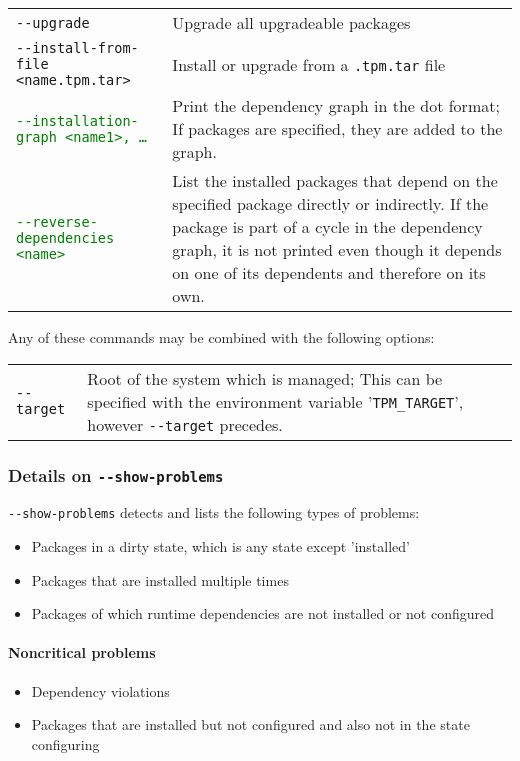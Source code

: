 \documentclass[a4paper]{article}
\newcommand{\variable}[1]{'\texttt{#1}'}
\newcommand{\green}[1]{\textcolor{green}{#1}}
\begin{document}
\begin{tabularx}{\textwidth}{lX}
		\texttt{-{}-upgrade} & Upgrade all upgradeable packages \\
		
		\texttt{-{}-install-from-file <name.tpm.tar>} & Install or upgrade from a \texttt{.tpm.tar} file \\
		
		\green{\texttt{-{}-installation-graph <name1>, \dots}} & Print the dependency graph in the dot format; If packages are specified, they are added to the graph. \\
		
		\green{\texttt{-{}-reverse-dependencies <name>}} & List the installed packages that depend on the specified package directly or indirectly. If the package is part of a cycle in the dependency graph, it is not printed even though it depends on one of its dependents and therefore on its own. \\
		
	\end{tabularx}
	\egroup

	\vspace{1em}
	Any of these commands may be combined with the following options: \\
	\bgroup
	\def\arraystretch{1.5}
	\begin{tabularx}{\textwidth}{lX}
		\texttt{-{}-target} & Root of the system which is managed; This can be specified with the environment variable \variable{TPM\_TARGET}, however \texttt{-{}-target} precedes. \\
	\end{tabularx}
	\egroup
	
	\subsubsection{Details on \texttt{-{}-show-problems}}
	
	\texttt{-{}-show-problems} detects and lists the following types of problems:
	
	\noindent
	\begin{itemize}
		\item Packages in a dirty state, which is any state except 'installed'
		\item Packages that are installed multiple times
		\item Packages of which runtime dependencies are not installed or not configured
	\end{itemize}

	\paragraph{Noncritical problems}
	\noindent
	\begin{itemize}
		\item Dependency violations
		\item Packages that are installed but not configured and also not in the state configuring
	\end{itemize}
	
\end{document}
